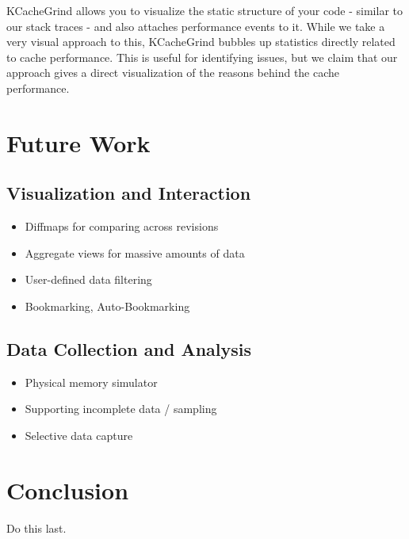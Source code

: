 \documentclass[annual]{acmsiggraph}
\begin{document}
KCacheGrind allows you to visualize the static structure of your code - similar to our stack traces - and also attaches performance events to it. While we take a very visual approach to this, KCacheGrind bubbles up statistics directly related to cache performance. This is useful for identifying issues, but we claim that our approach gives a direct visualization of the reasons behind the cache performance.


\section{Future Work}
  \subsection{Visualization and Interaction}
  \begin{itemize}
    \item Diffmaps for comparing across revisions
    \item Aggregate views for massive amounts of data
    \item User-defined data filtering
    \item Bookmarking, Auto-Bookmarking
  \end{itemize}

  \subsection{Data Collection and Analysis}
  \begin{itemize}
    \item Physical memory simulator
    \item Supporting incomplete data / sampling
    \item Selective data capture
  \end{itemize}

\section{Conclusion}
  Do this last.



\end{document}
